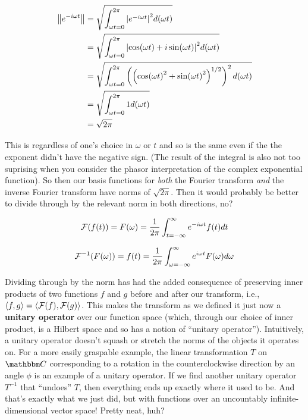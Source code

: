 \documentclass[letterpaper,12pt]{report}
\begin{document}
\[\begin{split}
  \norm{e^{-i\omega t}} &= \sqrt{\int_{\omega t=0}^{2\pi} \abs{e^{-i\omega t}}^2 d(\omega t)} \\
  &= \sqrt{\int_{\omega t=0}^{2\pi} \abs{\cos(\omega t) + i\sin(\omega t)}^2 d(\omega t)} \\
  &= \sqrt{\int_{\omega t=0}^{2\pi}
  \left(
    \left(\cos(\omega t)^2 + \sin(\omega t)^2\right)^{1/2}
    \right)^2 
    d(\omega t)} \\
  &= \sqrt{\int_{\omega t=0}^{2\pi} 1 d(\omega t)} \\
  &= \sqrt{2\pi}
\end{split}\]

This is regardless of one's choice in \(\omega\) or \(t\) and
so is the same even if the the exponent didn't have the
negative sign.
(The result of the integral is
also not too suprising when you consider the phasor interpretation of the complex exponential function).
So then our basis functions for \emph{both} the Fourier
transform \emph{and} the inverse Fourier transform have
norms of \(\sqrt{2\pi}\). Then it would probably be better
to divide through by the relevant norm in both directions, no?

\[\mathcal{F}(f(t)) = F(\omega)
  = \frac{1}{2\pi} \int_{t=-\infty}^{\infty} e^{-i\omega t} f(t) dt\]

\[\mathcal{F}^{-1}(F(\omega)) = f(t)
  = \frac{1}{2\pi} \int_{\omega=-\infty}^{\infty} e^{i\omega t} F(\omega) d\omega\]

Dividing through by the norm has had the added consequence
of preserving inner products of two functions \(f\) and \(g\)
before and after our transform, i.e., 
\(\left<f,g\right> = \left<\mathcal{F}(f),\mathcal{F}(g)\right>\).
This makes the transform as we defined it just now a
\textbf{unitary operator} over
our function space (which, through our choice of inner product,
is a Hilbert space and so has a notion of ``unitary operator'').
Intuitively, a unitary operator doesn't squash or stretch
the norms of the objects it operates on. For a more easily
graspable example, the linear transformation \(T\)
on \(\domain{C}\)
corresponding to a rotation in the counterclockwise direction
by an angle \(\phi\) is an example of a unitary operator.
If we find another unitary operator \(T^{-1}\) 
that ``undoes'' \(T\), then everything ends up exactly where
it used to be. And that's exactly what we just did,
but with functions 
over an uncountably infinite-dimensional vector space!
Pretty neat, huh?
\end{document}
